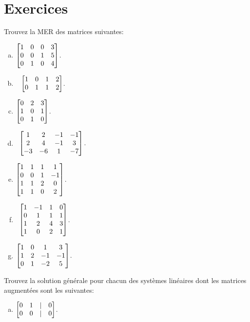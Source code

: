 \section*{Exercices}




 \begin{prob} \label{prob12.1} Trouvez la MER des matrices suivantes:
\medskip
\begin{enumerate}[a)]
\item $\bmatrix 1&0&0&3\cr 0&0&1&5\cr 0&1&0&4 \endbmatrix $.
\medskip 
 
\item\sov~
$\bmatrix 1&0&1&2\cr 0&1&1&2\endbmatrix $.
\medskip
 
\item $\bmatrix 0&2&3\\1&0&1\\ 0&1&0 \endbmatrix $.
\medskip
 
\item\sov~$\bmatrix 1&2&-1&-1\\2&4&-1&3\\ -3&-6&1&-7\endbmatrix$.
\medskip
 
\item $\bmatrix 1& 1& 1& 1\\ 0& 0& 1& -1\\ 1& 1& 2& 0\\ 1& 1& 0& 2 \endbmatrix$.\medskip
 
\item\sov~$\bmatrix 1 & -1 & 1 & 0 \\
 0 & 1 & 1 & 1 \\
 1 & 2 & 4 & 3 \\
 1 & 0 & 2 & 1\endbmatrix$.\medskip
 
\item $\bmatrix 1&0&1&3\\ 1&2&-1&-1\\ 0&1&-2&5\endbmatrix $.\medskip
 
\end{enumerate}

\end{prob} \begin{prob} \label{prob12.2} Trouvez la solution générale pour chacun des systèmes linéaires dont les matrices augmentées sont les suivantes:
\medskip
\begin{enumerate}[a)]

\item $\bmatrix  0 & 1 &|& 0 \\
 0 & 0 &|& 0 \endbmatrix$.
\medskip
  

\end{enumerate}
\end{prob}
